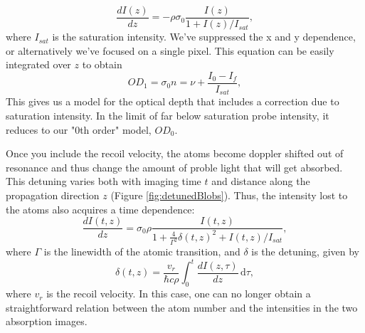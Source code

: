 \documentclass[12pt]{iopart}
\begin{document}
\begin{equation}
\frac{dI(z)}{dz}=-\rho\sigma_0\frac{I(z)}{1+I(z)/I_{sat}},
\end{equation}
 where  $I_{sat}$ is the saturation intensity. We've suppressed the x and y dependence, or alternatively we've focused on a single pixel.  This equation can be easily integrated over $z$ to obtain
\begin{equation} 
OD_1 =\sigma_0 n = \nu + \frac{I_0-I_f}{I_{sat}},
\label{eq2}
\end{equation}
 This gives us a model for the optical depth that includes a correction due to saturation intensity. In the limit of far below saturation probe intensity, it reduces to our "0th order" model, $OD_0$. 
\par Once you include the recoil velocity, the atoms become doppler shifted out of resonance and thus change the amount of proble light that will get absorbed. This detuning varies both with imaging time $t$ and distance along the propagation direction $z$ (Figure \ref{fig:detunedBlobs}). Thus, the intensity lost to the atoms also acquires a time dependence: 
\begin{equation}
\frac{dI(t,z)}{dz}=\sigma_0 \rho \frac{I(t,z)}{1+\frac{4}{\Gamma^2}\delta(t,z)^2 +I(t,z)/I_{sat}}, \label{eq3}
\end{equation}
where $\Gamma$ is the linewidth of the atomic transition, and $\delta$ is the detuning, given by 
\begin{equation}
\delta(t,z)=\frac{v_r}{\hbar c \rho}\int_0^t \frac{dI(z,\tau)}{dz}\,\mathrm{d}\tau, \label{eq4} 
\end{equation}
where  $v_r$ is the recoil velocity. In this case, one can no longer obtain a straightforward relation between the atom number and the intensities in the two absorption images.
\end{document}
